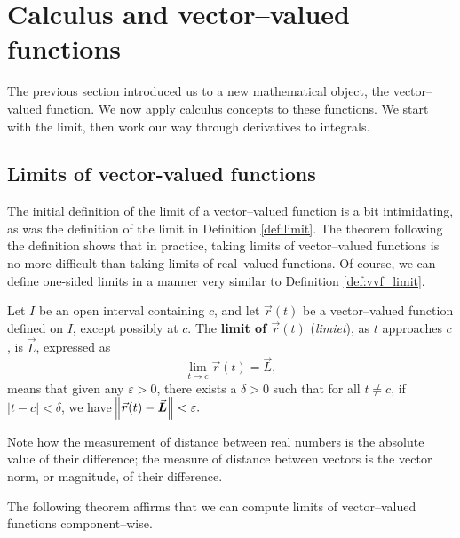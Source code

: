 \section{Calculus and vector--valued functions}\label{sec:vvf_calc}

The previous section introduced us to a new mathematical object, the vector--valued function. We now apply calculus concepts to these functions. We start with the limit, then work our way through derivatives to integrals.

\subsection{Limits of vector-valued functions}

The initial definition of the limit of a vector--valued function is a bit intimidating, as was the definition of the limit in Definition \ref{def:limit}. The theorem following the definition shows that in practice, taking limits of vector--valued functions is no more difficult than taking limits of real--valued functions. Of course,  we can define one-sided limits in a manner very similar to Definition \ref{def:vvf_limit}.

\begin{definition}\label{def:vvf_limit}
Let $I$ be an open interval containing $c$, and let $\vec r(t)$ be a vector--valued function defined on $I$, except possibly at $c$. %
The \textbf{limit of $\vec r(t)$} (\textit{limiet}), as $t$ approaches $c$, is $\vec L$, expressed as 
$$\lim_{t\to c} \vec r(t) = \vec L,$$ means that given any $\varepsilon>0$, there exists a $\delta>0$ such that for all $t\neq c$, if $|t-c| <\delta$, we have $\norm{\vec r(t) - \vec L} < \varepsilon.$
\end{definition}

Note how the measurement of distance between real numbers is the absolute value of their difference; the measure of distance between vectors is the vector norm, or magnitude, of their difference.

The following theorem affirms that we can compute limits of vector--valued functions component--wise.

